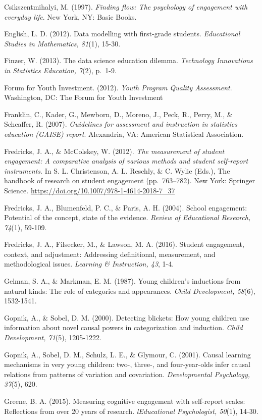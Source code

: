 \documentclass[]{msu-thesis}
\theoremstyle{definition}
\theoremstyle{definition}
\theoremstyle{definition}
\theoremstyle{remark}
\begin{document}
Csikszentmihalyi, M. (1997). \emph{Finding flow: The psychology of
engagement with everyday life}. New York, NY: Basic Books.

English, L. D. (2012). Data modelling with first-grade students.
\emph{Educational Studies in Mathematics, 81}(1), 15-30.

Finzer, W. (2013). The data science education dilemma. \emph{Technology
Innovations in Statistics Education, 7}(2), p.~1-9.

Forum for Youth Investment. (2012). \emph{Youth Program Quality
Assessment}. Washington, DC: The Forum for Youth Investment

Franklin, C., Kader, G., Mewborn, D., Moreno, J., Peck, R., Perry, M.,
\& Scheaffer, R. (2007). \emph{Guidelines for assessment and instruction
in statistics education (GAISE) report}. Alexandria, VA: American
Statistical Association.

Fredricks, J. A., \& McColskey, W. (2012). \emph{The measurement of
student engagement: A comparative analysis of various methods and
student self-report instruments}. In S. L. Christenson, A. L. Reschly,
\& C. Wylie (Eds.), The handbook of research on student engagement
(pp.~763--782). New York: Springer Science.
\url{https://doi.org/10.1007/978-1-4614-2018-7_37}

Fredricks, J. A., Blumenfeld, P. C., \& Paris, A. H. (2004). School
engagement: Potential of the concept, state of the evidence.
\emph{Review of Educational Research, 74}(1), 59-109.

Fredricks, J. A., Filsecker, M., \& Lawson, M. A. (2016). Student
engagement, context, and adjustment: Addressing definitional,
measurement, and methodological issues. \emph{Learning \& Instruction,
43}, 1-4.

Gelman, S. A., \& Markman, E. M. (1987). Young children's inductions
from natural kinds: The role of categories and appearances. \emph{Child
Development, 58}(6), 1532-1541.

Gopnik, A., \& Sobel, D. M. (2000). Detecting blickets: How young
children use information about novel causal powers in categorization and
induction. \emph{Child Development, 71}(5), 1205-1222.

Gopnik, A., Sobel, D. M., Schulz, L. E., \& Glymour, C. (2001). Causal
learning mechanisms in very young children: two-, three-, and
four-year-olds infer causal relations from patterns of variation and
covariation. \emph{Developmental Psychology, 37}(5), 620.

Greene, B. A. (2015). Measuring cognitive engagement with self-report
scales: Reflections from over 20 years of research. \emph{lEducational
Psychologist, 50}(1), 14-30.
\end{document}
